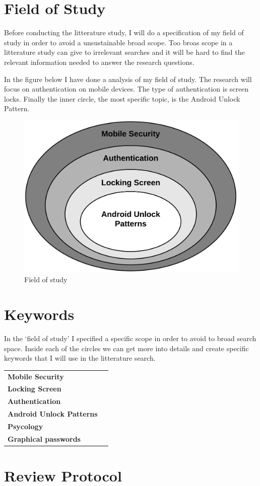     \section{Field of Study}
    Before conducting the litterature study, I will do a specification of my field of study in order to
    avoid a unsustainable broad scope. Too broas scope in a litterature study can give to irrelevant searches 
    and it will be hard to find the relevant information needed to answer the research questions. 

    In the figure below I have done a analysis of my field of study. The research will focus on authentication on mobile devices. 
    The type of authentication is screen locks. Finally the inner circle, the most specific topic, is the Android Unlock Pattern. 

    \begin{figure}[H]
    \centering
    \includegraphics[scale=0.25]{pics/Fieldofstudy.png}
    \caption{Field of study}
    \end{figure}

    \section*{Keywords}  
    In the `field of study' I specified a specific scope in order to avoid to broad search space. 
    Inside each of the circles we can get more into details and create specific keywords that I will use in 
     the litterature search. 

    \begin{tabular}{ || l | l ||}
      \hline
      {\bf Mobile Security} & \\
      {\bf Locking Screen} &  \\
      {\bf Authentication} &  \\
      {\bf Android Unlock Patterns} & \\ 
      {\bf Psycology} & \\
      {\bf Graphical passwords} & \\
      \hline
    \end{tabular}
    \section*{Review Protocol}
